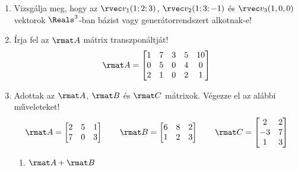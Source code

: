 \documentclass[a4paper, 12pt]{scrartcl}
\begin{document}
\begin{enumerate}
\begin{center}
        \end{center}

  \item Vizsgálja meg, hogy az $\rvec v_1(1; 2; 3)$, $\rvec v_2(1; 3; -1)$ és
        $\rvec v_3 (1, 0, 0)$ vektorok $\Reals^3$-ban bázist vagy
        generátorrendszert alkotnak-e!

  \item Írja fel az $\rmat A$ mátrix transzponáltját!
        $$
          \rmat A = \begin{bmatrix}
            1 & 7 & 3 & 5 & 10 \\
            0 & 5 & 0 & 4 & 0  \\
            2 & 1 & 0 & 2 & 1
          \end{bmatrix}
        $$

  \item Adottak az $\rmat A$, $\rmat B$ és $\rmat C$ mátrixok. Végezze el az
        alábbi műveleteket!
        $$
          \rmat A =\begin{bmatrix}
            2 & 5 & 1 \\
            7 & 0 & 3
          \end{bmatrix}
          \qquad
          \rmat B =\begin{bmatrix}
            6 & 8 & 2 \\
            1 & 2 & 3
          \end{bmatrix}
          \qquad
          \rmat C =\begin{bmatrix}
            2  & 2 \\
            -3 & 7 \\
            1  & 3
          \end{bmatrix}
        $$
        \begin{multicols}{3}
          \begin{enumerate}
            \item $\rmat A + \rmat B$


\end{enumerate}
\end{multicols}
\end{enumerate}
\end{document}

